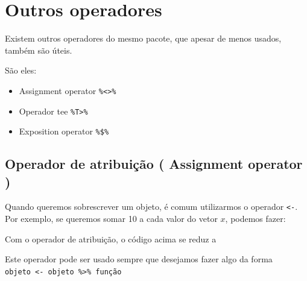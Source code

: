 \documentclass[
]{book}
\newenvironment{Shaded}{\begin{snugshade}}{\end{snugshade}}
\newcommand{\CommentTok}[1]{\textcolor[rgb]{0.56,0.35,0.01}{\textit{#1}}}
\newcommand{\DecValTok}[1]{\textcolor[rgb]{0.00,0.00,0.81}{#1}}
\newcommand{\KeywordTok}[1]{\textcolor[rgb]{0.13,0.29,0.53}{\textbf{#1}}}
\newcommand{\NormalTok}[1]{#1}
\newcommand{\OperatorTok}[1]{\textcolor[rgb]{0.81,0.36,0.00}{\textbf{#1}}}
\newcommand{\StringTok}[1]{\textcolor[rgb]{0.31,0.60,0.02}{#1}}
\begin{document}
\hypertarget{outros-operadores}{%
\section{Outros operadores}\label{outros-operadores}}

Existem outros operadores do mesmo pacote, que apesar de menos usados, também são úteis.

São eles:

\begin{itemize}
\item
  Assignment operator \texttt{\%\textless{}\textgreater{}\%}
\item
  Operador tee \texttt{\%T\textgreater{}\%}
\item
  Exposition operator \texttt{\%\$\%}
\end{itemize}

\hypertarget{operador-de-atribuiuxe7uxe3o-assignment-operator}{%
\subsection{Operador de atribuição ( Assignment operator )}\label{operador-de-atribuiuxe7uxe3o-assignment-operator}}

Quando queremos sobrescrever um objeto, é comum utilizarmos o operador \texttt{\textless{}-}. Por exemplo, se queremos somar 10 a cada valor do vetor \(x\), podemos fazer:

\begin{Shaded}
\end{Shaded}

Com o operador de atribuição, o código acima se reduz a

\begin{Shaded}
\end{Shaded}

Este operador pode ser usado sempre que desejamos fazer algo da forma \texttt{objeto\ \textless{}-\ objeto\ \%\textgreater{}\%\ função}
\end{document}
